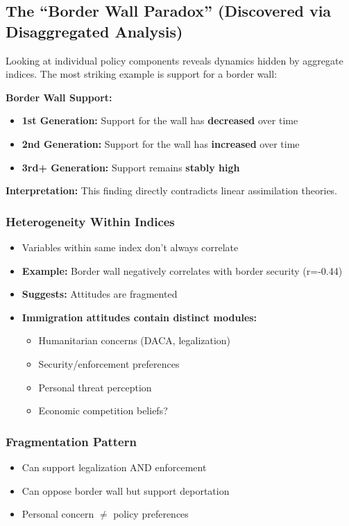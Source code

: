 \documentclass[11pt,letterpaper]{article}
\begin{document}
\subsection{The ``Border Wall Paradox'' (Discovered via Disaggregated Analysis)}

Looking at individual policy components reveals dynamics hidden by aggregate indices. The most striking example is support for a border wall:

\textbf{Border Wall Support:}
\begin{itemize}
    \item \textbf{1st Generation:} Support for the wall has \textbf{decreased} over time
    \item \textbf{2nd Generation:} Support for the wall has \textbf{increased} over time
    \item \textbf{3rd+ Generation:} Support remains \textbf{stably high}
\end{itemize}

\textbf{Interpretation:} This finding directly contradicts linear assimilation theories.

\subsubsection{Heterogeneity Within Indices}
\begin{itemize}
    \item Variables within same index don't always correlate
    \item \textbf{Example:} Border wall negatively correlates with border security (r=-0.44)
    \item \textbf{Suggests:} Attitudes are fragmented
    \item \textbf{Immigration attitudes contain distinct modules:}
    \begin{itemize}
        \item Humanitarian concerns (DACA, legalization)
        \item Security/enforcement preferences
        \item Personal threat perception
        \item Economic competition beliefs?
    \end{itemize}
\end{itemize}

\subsubsection{Fragmentation Pattern}
\begin{itemize}
    \item Can support legalization AND enforcement
    \item Can oppose border wall but support deportation
    \item Personal concern $\neq$ policy preferences
\end{itemize}
\end{document}

